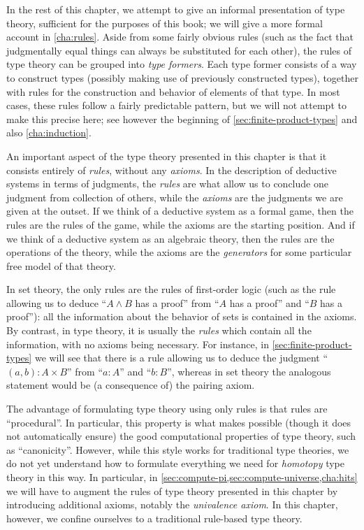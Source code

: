 In the rest of this chapter, we attempt to give an informal presentation of type theory, sufficient for the purposes of this book; we will give a more formal account in \autoref{cha:rules}.
Aside from some fairly obvious rules (such as the fact that judgmentally equal things can always be substituted for each other), the rules of type theory can be grouped into \emph{type formers}.
Each type former consists of a way to construct types (possibly making use of previously constructed types), together with rules for the construction and behavior of elements of that type.
In most cases, these rules follow a fairly predictable pattern, but we will not attempt to make this precise here; see however the beginning of \autoref{sec:finite-product-types} and also \autoref{cha:induction}.

%
%
An important aspect of the type theory presented in this chapter is that it consists entirely of \emph{rules}, without any \emph{axioms}.
In the description of deductive systems in terms of judgments, the \emph{rules} are what allow us to conclude one judgment from collection of others, while the \emph{axioms} are the judgments we are given at the outset.
If we think of a deductive system as a formal game, then the rules are the rules of the game, while the axioms are the starting position.
And if we think of a deductive system as an algebraic theory, then the rules are the operations of the theory, while the axioms are the \emph{generators} for some particular free model of that theory.

In set theory, the only rules are the rules of first-order logic (such as the rule allowing us to deduce ``$A\wedge B$ has a proof'' from ``$A$ has a proof'' and ``$B$ has a proof''): all the information about the behavior of sets is contained in the axioms.
By contrast, in type theory, it is usually the \emph{rules} which contain all the information, with no axioms being necessary.
For instance, in \autoref{sec:finite-product-types} we will see that there is a rule allowing us to deduce the judgment ``$(a,b):A\times B$'' from ``$a:A$'' and ``$b:B$'', whereas in set theory the analogous statement would be (a consequence of) the pairing axiom.

The advantage of formulating type theory using only rules is that rules are ``procedural''.
In particular, this property is what makes possible (though it does not automatically ensure) the good computational properties of type theory, such as ``canonicity''.
However, while this style works for traditional type theories, we do not yet understand how to formulate everything we need for \emph{homotopy} type theory in this way.
In particular, in \autoref{sec:compute-pi,sec:compute-universe,cha:hits} we will have to augment the rules of type theory presented in this chapter by introducing additional axioms, notably the \emph{univalence axiom}.
In this chapter, however, we confine ourselves to a traditional rule-based type theory.


